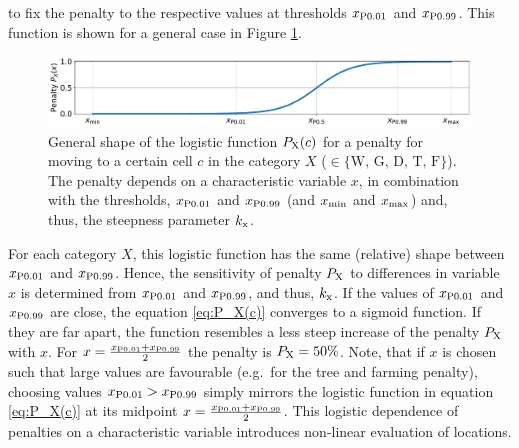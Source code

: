 to fix the penalty to the respective values at thresholds $x_{\rm P0.01}$ and $x_{\rm P0.99}$.
This function is shown for a general case in Figure \ref{fig:logF}.
\begin{figure}
	\centering
	\includegraphics[width=\textwidth]{images/general_logF.pdf}
	\caption{General shape of the logistic function $P_{\rm X}(c)$ for a penalty for moving to a certain cell $c$ in the category $X$ ($\in\{\text{W, G, D, T, F}\}$). The penalty depends on a characteristic variable $x$, in combination with the thresholds, $x_{\rm P0.01}$ and $x_{\rm P0.99}$ (and $x_{\rm min}$ and $x_{\rm max}$) and, thus, the steepness parameter $k_{\rm x}$.}
	\label{fig:logF}
\end{figure}
For each category $X$, this logistic function has the same (relative) shape between $x_{\rm P0.01}$ and $x_{\rm P0.99}$. %
Hence, the sensitivity of penalty $P_{\rm X}$ to differences in variable $x$ is determined from $x_{\rm P0.01}$ and $x_{\rm P0.99}$, and thus, $k_{\rm x}$.
If the values of $x_{\rm P0.01}$ and $x_{\rm P0.99}$ are close, the equation \ref{eq:P_X(c)} converges to a sigmoid function. 
If they are far apart, the function resembles a less steep increase of the penalty $P_{\rm X}$ with $x$.
For $x=\frac{x_{\rm P0.01} + x_{\rm P0.99}}{2}$ the penalty is $P_{\rm X} = 50\%$.
Note, that if $x$ is chosen such that large values are favourable (e.g.\ for the tree and farming penalty), choosing values $x_{\rm P0.01}>x_{\rm P0.99}$ simply mirrors the logistic function in equation \ref{eq:P_X(c)} at its midpoint $x=\frac{x_{\rm P0.01}+x_{\rm P0.99}}{2}$. %
This logistic dependence of penalties on a characteristic variable introduces non-linear evaluation of locations.


